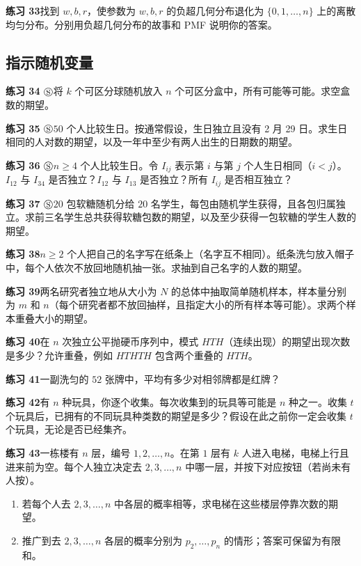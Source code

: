 \documentclass[UTF8,12pt,a4paper,fontset=fandol]{ctexart}
\begin{document}
\noindent\textbf{练习 33}\quad 找到 $w,b,r$，使参数为 $w,b,r$ 的负超几何分布退化为 $\{0,1,\ldots,n\}$ 上的离散均匀分布。分别用负超几何分布的故事和 PMF 说明你的答案。

\subsection*{指示随机变量}

\noindent\textbf{练习 34 $\circledS$}\quad 将 $k$ 个可区分球随机放入 $n$ 个可区分盒中，所有可能等可能。求空盒数的期望。

\noindent\textbf{练习 35 $\circledS$}\quad $50$ 个人比较生日。按通常假设，生日独立且没有 2 月 29 日。求生日相同的人对数的期望，以及一年中至少有两人出生的日期数的期望。

\noindent\textbf{练习 36 $\circledS$}\quad $n\ge4$ 个人比较生日。令 $I_{ij}$ 表示第 $i$ 与第 $j$ 个人生日相同（$i<j$）。$I_{12}$ 与 $I_{34}$ 是否独立？$I_{12}$ 与 $I_{13}$ 是否独立？所有 $I_{ij}$ 是否相互独立？

\noindent\textbf{练习 37 $\circledS$}\quad $20$ 包软糖随机分给 $20$ 名学生，每包由随机学生获得，且各包归属独立。求前三名学生总共获得软糖包数的期望，以及至少获得一包软糖的学生人数的期望。

\noindent\textbf{练习 38}\quad $n\ge2$ 个人把自己的名字写在纸条上（名字互不相同）。纸条洗匀放入帽子中，每个人依次不放回地随机抽一张。求抽到自己名字的人数的期望。

\noindent\textbf{练习 39}\quad 两名研究者独立地从大小为 $N$ 的总体中抽取简单随机样本，样本量分别为 $m$ 和 $n$（每个研究者都不放回抽样，且指定大小的所有样本等可能）。求两个样本重叠大小的期望。

\noindent\textbf{练习 40}\quad 在 $n$ 次独立公平抛硬币序列中，模式 $HTH$（连续出现）的期望出现次数是多少？允许重叠，例如 $HTHTH$ 包含两个重叠的 $HTH$。

\noindent\textbf{练习 41}\quad 一副洗匀的 $52$ 张牌中，平均有多少对相邻牌都是红牌？

\noindent\textbf{练习 42}\quad 有 $n$ 种玩具，你逐个收集。每次收集到的玩具等可能是 $n$ 种之一。收集 $t$ 个玩具后，已拥有的不同玩具种类数的期望是多少？假设在此之前你一定会收集 $t$ 个玩具，无论是否已经集齐。

\noindent\textbf{练习 43}\quad 一栋楼有 $n$ 层，编号 $1,2,\ldots,n$。在第 $1$ 层有 $k$ 人进入电梯，电梯上行且进来前为空。每个人独立决定去 $2,3,\ldots,n$ 中哪一层，并按下对应按钮（若尚未有人按）。
\begin{enumerate}
  \item[(a)] 若每个人去 $2,3,\ldots,n$ 中各层的概率相等，求电梯在这些楼层停靠次数的期望。
  \item[(b)] 推广到去 $2,3,\ldots,n$ 各层的概率分别为 $p_2,\ldots,p_n$ 的情形；答案可保留为有限和。
\end{enumerate}
\end{document}
